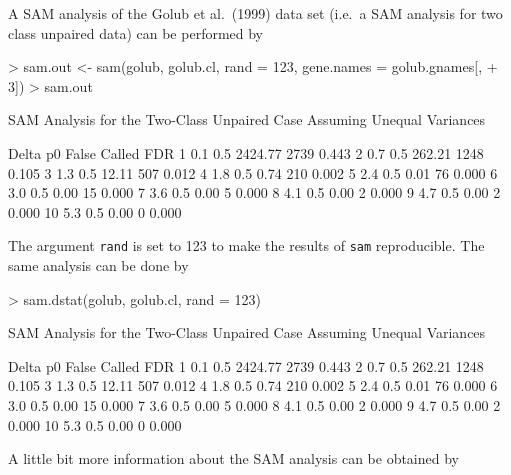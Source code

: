 \documentclass[a4paper]{article}
\begin{document}
A SAM analysis of the Golub et al.\ (1999) data set (i.e.\ a SAM analysis for
two class unpaired data) can be performed by

\begin{Schunk}
\begin{Sinput}
> sam.out <- sam(golub, golub.cl, rand = 123, gene.names = golub.gnames[, 
+     3])
> sam.out
\end{Sinput}
\begin{Soutput}
SAM Analysis for the Two-Class Unpaired Case Assuming Unequal Variances 
 
   Delta  p0   False Called   FDR
1    0.1 0.5 2424.77   2739 0.443
2    0.7 0.5  262.21   1248 0.105
3    1.3 0.5   12.11    507 0.012
4    1.8 0.5    0.74    210 0.002
5    2.4 0.5    0.01     76 0.000
6    3.0 0.5    0.00     15 0.000
7    3.6 0.5    0.00      5 0.000
8    4.1 0.5    0.00      2 0.000
9    4.7 0.5    0.00      2 0.000
10   5.3 0.5    0.00      0 0.000
\end{Soutput}
\end{Schunk}

The argument \texttt{rand} is set to 123 to make the results of \texttt{sam} reproducible.
The same analysis can be done by

\begin{Schunk}
\begin{Sinput}
> sam.dstat(golub, golub.cl, rand = 123)
\end{Sinput}
\begin{Soutput}
SAM Analysis for the Two-Class Unpaired Case Assuming Unequal Variances 
 
   Delta  p0   False Called   FDR
1    0.1 0.5 2424.77   2739 0.443
2    0.7 0.5  262.21   1248 0.105
3    1.3 0.5   12.11    507 0.012
4    1.8 0.5    0.74    210 0.002
5    2.4 0.5    0.01     76 0.000
6    3.0 0.5    0.00     15 0.000
7    3.6 0.5    0.00      5 0.000
8    4.1 0.5    0.00      2 0.000
9    4.7 0.5    0.00      2 0.000
10   5.3 0.5    0.00      0 0.000
\end{Soutput}
\end{Schunk}

A little bit more information about the SAM analysis can be obtained by
\end{document}
